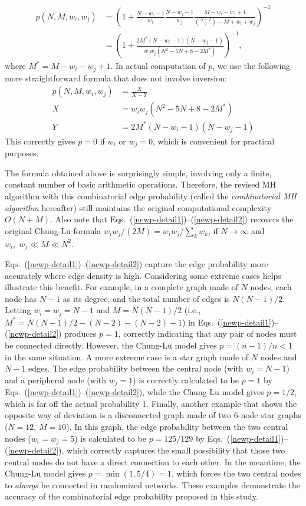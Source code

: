 \documentclass{llncs}
\begin{document}
\begin{align}
p(N, M, w_i, w_j) &= \left( 1 + \frac{N-w_i-1}{w_i} \frac{N-w_j-1}{w_j}
\frac{M-w_i-w_j+1}{\binom{N-2}{2} - M + w_i+w_j} \right)^{-1}\\
&= \left( 1 + \frac{2M^*(N-w_i-1)(N-w_j-1)}{w_iw_j (N^2-5N+8-2M^*)} \right)^{-1} ,
\end{align}
where $M^* = M-w_i-w_j+1$. In actual computation of $p$, we use the
following more straightforward formula that does not involve inversion:
\begin{align}
p(N, M, w_i, w_j) &= \frac{X} {X + Y} \label{newp-detail1}\\
X &= w_iw_j (N^2-5N+8-2M^*) \\
Y &= 2M^*(N-w_i-1)(N-w_j-1) \label{newp-detail2}
\end{align}
This correctly gives $p=0$ if $w_i$ or $w_j = 0$, which is convenient
for practical purposes.

The formula obtained above is surprisingly simple, involving only a
finite, constant number of basic arithmetic operations. Therefore, the
revised MH algorithm with this combinatorial edge probability (called
the {\em combinatorial MH algorithm} hereafter) still maintains the
original computational complexity $O(N+M)$. Also note that
Eqs.~(\ref{newp-detail1})--(\ref{newp-detail2}) recovers the
original Chung-Lu formula $w_iw_j / (2M) = w_iw_j / \sum_k w_k$, if $N
\to \infty$ and $w_i, \; w_j \ll M \ll N^2$.

Eqs.~(\ref{newp-detail1})--(\ref{newp-detail2}) capture the edge
probability more accurately where edge density is high. Considering
some extreme cases helps illustrate this benefit. For example, in a
complete graph made of $N$ nodes, each node has $N-1$ as its degree,
and the total number of edges is $N(N-1)/2$. Letting $w_i=w_j=N-1$ and
$M=N(N-1)/2$ (i.e., $M^*=N(N-1)/2-(N-2)-(N-2)+1$) in
Eqs.~(\ref{newp-detail1})--(\ref{newp-detail2}) produces $p=1$,
correctly indicating that any pair of nodes must be connected
directly. However, the Chung-Lu model gives $p=(n-1)/n < 1$ in the same situation. A more
extreme case is a star graph made of $N$ nodes and $N-1$ edges. The
edge probability between the central node (with $w_i=N-1$) and a
peripheral node (with $w_j=1$) is correctly calculated to be $p=1$ by
Eqs.~(\ref{newp-detail1})--(\ref{newp-detail2}), while the Chung-Lu
model gives $p=1/2$, which is far off the actual probability
1. Finally, another example that shows the opposite way of deviation
is a disconnected graph made of two 6-node star graphs ($N=12$,
$M=10$). In this graph, the edge probability between the two central
nodes ($w_i=w_j=5$) is calculated to be $p=125/129$ by
Eqs.~(\ref{newp-detail1})--(\ref{newp-detail2}), which correctly
captures the small possibility that those two central nodes do not
have a direct connection to each other. In the meantime, the Chung-Lu
model gives $p=\min(1, 5/4) = 1$, which forces the two central nodes to {\em
  always} be connected in randomized networks. These examples
demonstrate the accuracy of the combinatorial edge probability
proposed in this study.
\end{document}
